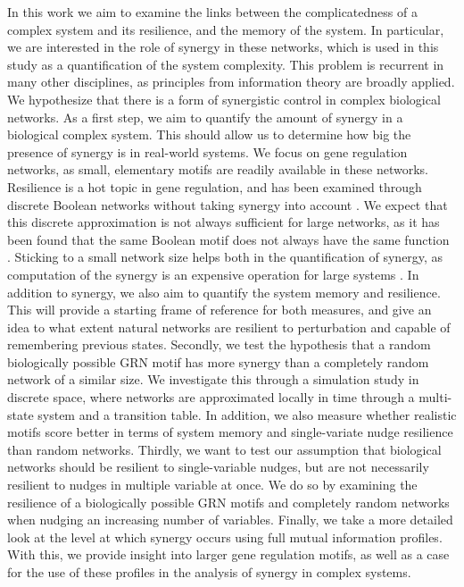 \documentclass[../main.tex]{subfiles}
\begin{document}
In this work we aim to examine the links between the complicatedness of a complex system and its resilience, and the memory of the system.
In particular, we are interested in the role of synergy in these networks, which is used in this study as a quantification of the system complexity.
This problem is recurrent in many other disciplines, as principles from information theory are broadly applied.
We hypothesize that there is a form of synergistic control in complex biological networks.
As a first step, we aim to quantify the amount of synergy in a biological complex system.
This should allow us to determine how big the presence of synergy is in real-world systems.
We focus on gene regulation networks, as small, elementary motifs are readily available in these networks.
Resilience is a hot topic in gene regulation, and has been examined through discrete Boolean networks without taking synergy into account \cite{peixoto2012emergence}.
We expect that this discrete approximation is not always sufficient for large networks, as it has been found that the same Boolean motif does not always have the same function \cite{ingram2006network}.
Sticking to a small network size helps both in the quantification of synergy, as computation of the synergy is an expensive operation for large systems \cite{jointpdf}.
In addition to synergy, we also aim to quantify the system memory and resilience.
This will provide a starting frame of reference for both measures, and give an idea to what extent natural networks are resilient to perturbation and capable of remembering previous states.
Secondly, we test the hypothesis that a random biologically possible GRN motif has more synergy than a completely random network of a similar size. 
We investigate this through a simulation study in discrete space, where networks are approximated locally in time through a multi-state system and a transition table.
In addition, we also measure whether realistic motifs score better in terms of system memory and single-variate nudge resilience than random networks. %
Thirdly, we want to test our assumption that biological networks should be resilient to single-variable nudges, but are not necessarily resilient to nudges in multiple variable at once.
We do so by examining the resilience of a biologically possible GRN motifs and completely random networks when nudging an increasing number of variables.
Finally, we take a more detailed look at the level at which synergy occurs using full mutual information profiles.
With this, we provide insight into larger gene regulation motifs, as well as a case for the use of these profiles in the analysis of synergy in complex systems.
\end{document}
